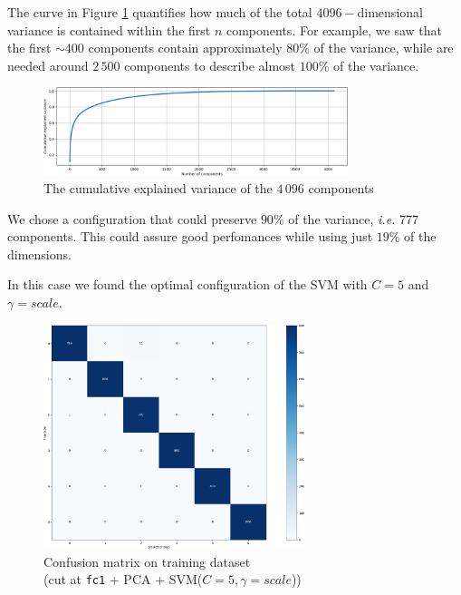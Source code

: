 \documentclass[compsoc]{IEEEtran}
\begin{document}
The curve in Figure \ref{fig:var1} quantifies how much of the total $4096-$dimensional variance is contained within the first $n$ components. For example, we saw that the first ${\sim400}$ components contain approximately $80\%$ of the variance, while are needed around $2\,500$ components to describe almost $100\%$ of the variance.
\begin{figure}[ht!]
\centering                                                                        
\includegraphics[width=3.5in]{../images/var-1.png}
\captionsetup{justification=centering}                                                                                         
\caption{The cumulative explained variance of the $4\,096$ components}
\label{fig:var1}                                                                                                                               
\end{figure}
We chose a configuration that could preserve $90\%$ of the variance, \emph{i.e.} $777$ components. This could assure good perfomances while using just $19\%$ of the dimensions.\par
In this case we found the optimal configuration of the SVM with $C=5$ and $\gamma=scale$.

\begin{figure}[ht!]
\centering                                                                        
\includegraphics[width=3in]{../images/cm1-pca-train.png}
\captionsetup{justification=centering}                                                                                         
\caption{Confusion matrix on training dataset \\ (cut at \texttt{fc1} + PCA + SVM($C=5, \gamma=scale$))}
\label{fig:cm1-pca-train}                                                                                                                               
\end{figure}
\end{document}
